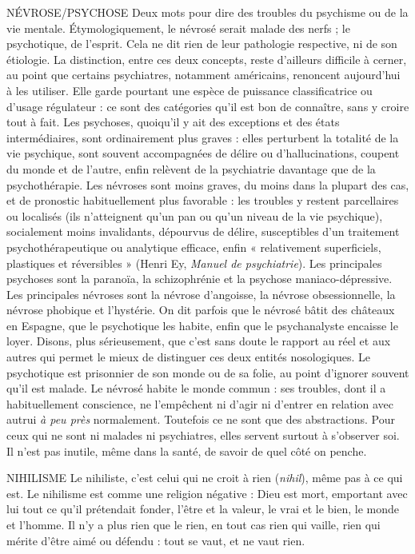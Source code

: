 NÉVROSE/PSYCHOSE Deux mots pour dire des troubles du psychisme ou
de la vie mentale. Étymologiquement, le névrosé
serait malade des nerfs ; le psychotique, de l’esprit. Cela ne dit rien de leur
pathologie respective, ni de son étiologie. La distinction, entre ces deux
concepts, reste d’ailleurs difficile à cerner, au point que certains psychiatres,
notamment américains, renoncent aujourd’hui à les utiliser. Elle garde pourtant
une espèce de puissance classificatrice ou d’usage régulateur : ce sont des
catégories qu’il est bon de connaître, sans y croire tout à fait. Les psychoses,
quoiqu'il y ait des exceptions et des états intermédiaires, sont ordinairement
plus graves : elles perturbent la totalité de la vie psychique, sont souvent accompagnées
de délire ou d’hallucinations, coupent du monde et de l’autre, enfin
relèvent de la psychiatrie davantage que de la psychothérapie. Les névroses sont
moins graves, du moins dans la plupart des cas, et de pronostic habituellement
plus favorable : les troubles y restent parcellaires ou localisés (ils n’atteignent
qu'un pan ou qu’un niveau de la vie psychique), socialement moins invalidants,
dépourvus de délire, susceptibles d’un traitement psychothérapeutique
ou analytique efficace, enfin « relativement superficiels, plastiques et réversibles »
(Henri Ey, {\it Manuel de psychiatrie}). Les principales psychoses sont la
paranoïa, la schizophrénie et la psychose maniaco-dépressive. Les principales
névroses sont la névrose d’angoisse, la névrose obsessionnelle, la névrose phobique
et l’hystérie. On dit parfois que le névrosé bâtit des châteaux en Espagne,
que le psychotique les habite, enfin que le psychanalyste encaisse le loyer.
Disons, plus sérieusement, que c’est sans doute le rapport au réel et aux autres
qui permet le mieux de distinguer ces deux entités nosologiques. Le psychotique
est prisonnier de son monde ou de sa folie, au point d’ignorer souvent
qu’il est malade. Le névrosé habite le monde commun : ses troubles, dont il a
habituellement conscience, ne l’empêchent ni d’agir ni d’entrer en relation avec
autrui {\it à peu près} normalement. Toutefois ce ne sont que des abstractions. Pour
ceux qui ne sont ni malades ni psychiatres, elles servent surtout à s’observer soi.
Il n’est pas inutile, même dans la santé, de savoir de quel côté on penche.

NIHILISME Le nihiliste, c’est celui qui ne croit à rien ({\it nihil}), même pas à
ce qui est. Le nihilisme est comme une religion négative :
Dieu est mort, emportant avec lui tout ce qu’il prétendait fonder, l’être et la
valeur, le vrai et le bien, le monde et l’homme. Il n’y a plus rien que le rien, en
tout cas rien qui vaille, rien qui mérite d’être aimé ou défendu : tout se vaut, et
ne vaut rien.


